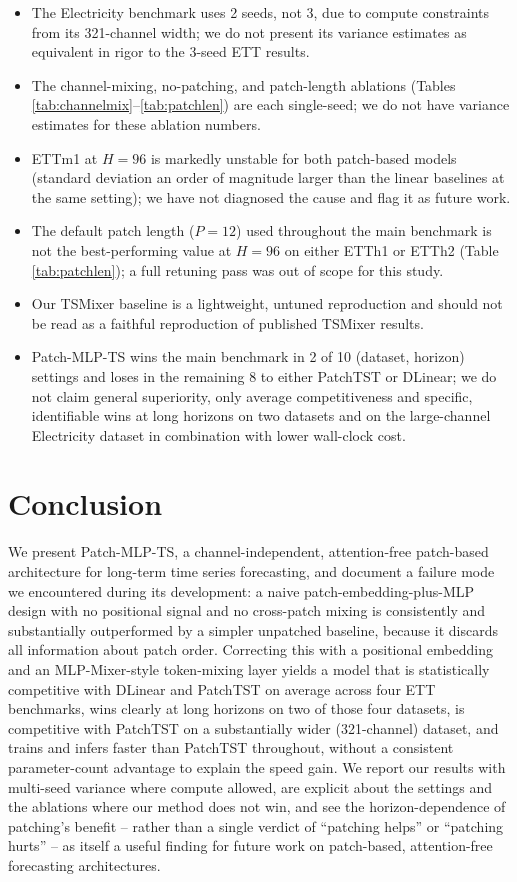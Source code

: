 \documentclass[conference]{IEEEtran}
\begin{document}
\begin{itemize}
\item The Electricity benchmark uses 2 seeds, not 3, due to compute constraints
from its 321-channel width; we do not present its variance estimates as
equivalent in rigor to the 3-seed ETT results.
\item The channel-mixing, no-patching, and patch-length ablations (Tables
\ref{tab:channelmix}--\ref{tab:patchlen}) are each single-seed; we do not have
variance estimates for these ablation numbers.
\item ETTm1 at $H=96$ is markedly unstable for both patch-based models (standard
deviation an order of magnitude larger than the linear baselines at the same
setting); we have not diagnosed the cause and flag it as future work.
\item The default patch length ($P=12$) used throughout the main benchmark is not
the best-performing value at $H=96$ on either ETTh1 or ETTh2 (Table
\ref{tab:patchlen}); a full retuning pass was out of scope for this study.
\item Our TSMixer baseline is a lightweight, untuned reproduction and should not
be read as a faithful reproduction of published TSMixer results.
\item Patch-MLP-TS wins the main benchmark in 2 of 10 (dataset, horizon) settings
and loses in the remaining 8 to either PatchTST or DLinear; we do not claim
general superiority, only average competitiveness and specific, identifiable
wins at long horizons on two datasets and on the large-channel Electricity
dataset in combination with lower wall-clock cost.
\end{itemize}

\section{Conclusion}

We present Patch-MLP-TS, a channel-independent, attention-free patch-based
architecture for long-term time series forecasting, and document a failure mode we
encountered during its development: a naive patch-embedding-plus-MLP design with no
positional signal and no cross-patch mixing is consistently and substantially
outperformed by a simpler unpatched baseline, because it discards all information
about patch order. Correcting this with a positional embedding and an MLP-Mixer-style
token-mixing layer yields a model that is statistically competitive with DLinear and
PatchTST on average across four ETT benchmarks, wins clearly at long horizons on two
of those four datasets, is competitive with PatchTST on a substantially wider
(321-channel) dataset, and trains and infers faster than PatchTST throughout,
without a consistent parameter-count advantage to explain the speed gain. We report
our results with multi-seed variance where compute allowed, are explicit about the
settings and the ablations where our method does not win, and see the
horizon-dependence of patching's benefit -- rather than a single verdict of
``patching helps'' or ``patching hurts'' -- as itself a useful finding for future
work on patch-based, attention-free forecasting architectures.
\end{document}
